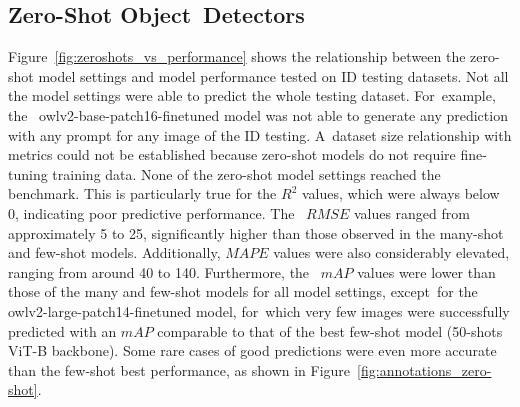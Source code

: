 \documentclass[12pt,a4paper,oneside]{report}
\begin{document}
\subsection{Zero-Shot Object~Detectors}

Figure~\ref{fig:zeroshots_vs_performance} shows the relationship between the zero-shot 
model settings and model performance tested on ID testing datasets. Not all the 
model settings were able to predict the whole testing dataset. For~example, the~
owlv2-base-patch16-finetuned model was not able to generate any prediction with 
any prompt for any image of the ID testing. A~dataset size relationship with metrics 
could not be established because zero-shot models do not require fine-tuning training 
data.
None of the zero-shot model settings reached the benchmark. This is particularly true for the 
$R^2$ values, which were always below 0, indicating poor predictive performance. The~
$RMSE$ values ranged from approximately 5 to 25, significantly higher than those 
observed in the many-shot and few-shot models. Additionally, $MAPE$ values were 
also considerably elevated, ranging from around 40 to 140. Furthermore, the~
$mAP$ values were lower than those of the many and few-shot models for all model 
settings, except~for the owlv2-large-patch14-finetuned model, for~which very few 
images were successfully predicted with an 
$mAP$ comparable to that of the best few-shot model (50-shots ViT-B backbone).
Some rare cases of good predictions were even more accurate than the few-shot best performance, 
as shown in Figure~\ref{fig:annotations_zero-shot}.
\end{document}
